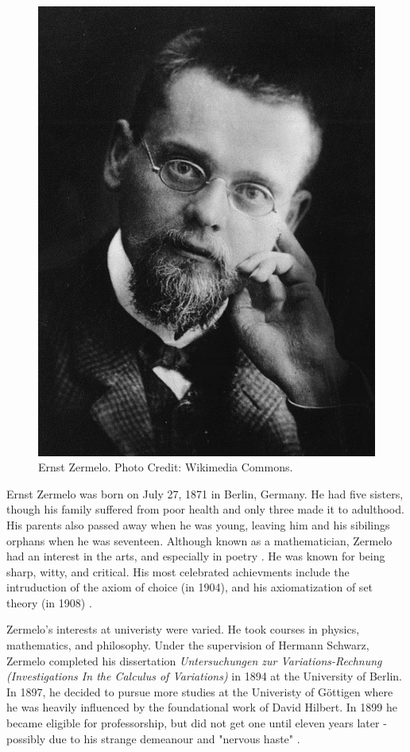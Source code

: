 \documentclass[../../../include/open-logic-section]{subfiles}
\begin{document}
\begin{figure}[h!] 
\centering
\includegraphics[scale=1]{ernst-zermelo.jpg} 
\caption{Ernst Zermelo. Photo Credit: Wikimedia Commons.} 
\end{figure}

Ernst Zermelo was born on July 27, 1871 in Berlin, Germany. He had five
sisters, though his family suffered from poor health and only three made it
to adulthood. His parents also passed away when he was young, leaving him
and his sibilings orphans when he was seventeen. Although known as a
mathematician, Zermelo had an interest in the arts, and especially in
poetry \citep[5]{Ebbinghaus2015}. He was known for being sharp, witty, and
critical. His most celebrated achievments include the intruduction of the
axiom of choice (in 1904), and his axiomatization of set theory (in 1908)
\citep[3]{Ebbinghaus2010}.

Zermelo's interests at univeristy were varied. He took courses in physics,
mathematics, and philosophy. Under the supervision of Hermann Schwarz,
Zermelo completed his dissertation \emph{Untersuchungen zur
Variations-Rechnung (Investigations In the Calculus of Variations)} in 1894
at the University of Berlin. In 1897, he decided to pursue more studies at
the Univeristy of G\"{o}ttigen where he was heavily influenced by the
foundational work of David Hilbert. In 1899 he became eligible for
professorship, but did not get one until eleven years later - possibly due
to his strange demeanour and "nervous haste" \citep[15]{Ebbinghaus2010}.
\end{document}
